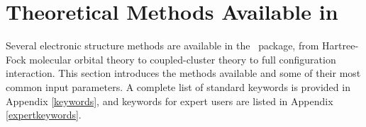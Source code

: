 \section{Theoretical Methods Available in \PSIfour}

Several electronic structure methods are available in the \PSIfour\
package, from Hartree-Fock molecular orbital theory to coupled-cluster
theory to full configuration interaction.  This section introduces
the methods available and some of their most common input parameters.
A complete list of standard keywords is provided in Appendix
\ref{keywords}, and keywords for expert users are listed in Appendix
\ref{expertkeywords}.
 
